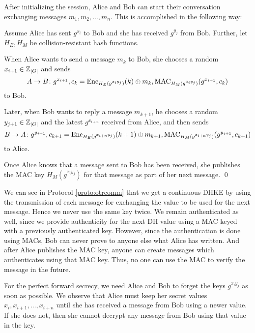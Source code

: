 After initializing the session, Alice and Bob can start their conversation 
exchanging messages \(m_1, m_2, \ldots, m_n\).
This is accomplished in the following way:

\begin{protocol}\label{proto:otrcomm}
  Assume Alice has sent \(g^{x_i}\) to Bob and she has received \(g^{y_j}\) 
  from Bob.
  Further, let \(H_E, H_M\) be collision-resistant hash functions.

  When Alice wants to send a message \(m_k\) to Bob, she chooses a random 
  \(x_{i+1}\in\operatorname{\mathbb Z}_{|G|}\) and sends
  \begin{equation*}
    A\to B\colon g^{x_{i+1}},
    c_k = \operatorname{\mathrm{Enc}}_{H_E( g^{x_i y_j} )}( k )\oplus m_k,
      \operatorname{\mathrm{MAC}}_{H_M( g^{x_i y_j} )}( g^{x_{i+1}}, c_k )
  \end{equation*}
  to Bob.

  Later, when Bob wants to reply a message \(m_{k+1}\), he chooses a random 
  \(y_{j+1}\in\operatorname{\mathbb Z}_{|G|}\) and the latest \(g^{x_{i+n}}\) received from Alice, 
  and then sends
  \begin{equation*}
    B\to A\colon g^{y_{j+1}},
    c_{k+1} = \operatorname{\mathrm{Enc}}_{H_E( g^{x_{i+n} y_j} )}( k+1 )\oplus m_{k+1},
    \operatorname{\mathrm{MAC}}_{H_M( g^{x_{i+n} y_j} )}( g^{y_{j+1}}, c_{k+1} )
  \end{equation*}
  to Alice.

  Once Alice knows that a message sent to Bob has been received, she publishes 
  the \ac{MAC} key \( H_M( g^{x_i y_j} ) \) for that message as part of her 
  next message.
  \qed
\end{protocol}

We can see in Protocol \ref{proto:otrcomm} that we get a continuous \ac{DHKE} 
by using the transmission of each message for exchanging the value to be used 
for the next message.
Hence we never use the same key twice.
We remain authenticated as well, since we provide authenticity for the next 
\ac{DH} value using a \ac{MAC} keyed with a previously authenticated key.
However, since the authentication is done using \acp{MAC}, Bob can never prove 
to anyone else what Alice has written.
And after Alice publishes the \ac{MAC} key, anyone can create messages which 
authenticates using that \ac{MAC} key.
Thus, no one can use the \ac{MAC} to verify the message in the future.

For the perfect forward secrecy, we need Alice and Bob to forget the keys 
\(g^{x_i y_j}\) as soon as possible.
We observe that Alice must keep her secret values \(x_i, x_{i+1}, \ldots, 
x_{i+n}\) until she has received a message from Bob using a newer value.
If she does not, then she cannot decrypt any message from Bob using that value 
in the key.


